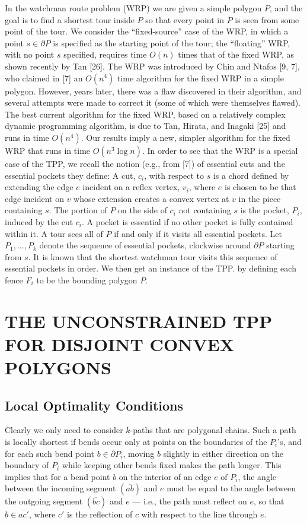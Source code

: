 \documentclass[a4paper]{article}
\begin{document}
In the watchman route problem (WRP) we are given a simple polygon \(P\), and the goal is to find a shortest tour inside \(P\) so that every point in \(P\) is seen from some point of the tour. We consider the “fixed-source” case of the WRP, in which a point \(s \in \partial P\) is specified as the starting point of the tour; the “floating” WRP, with no point \(s\) specified, requires time \(O(n)\) times that of the fixed WRP, as shown recently by Tan [26]. The WRP was introduced by Chin and Ntafos [9, 7], who claimed in [7] an \(O(n ^ 4)\) time algorithm for the fixed WRP in a simple polygon. However, years later, there was a flaw discovered in their algorithm, and several attempts were made to correct it (some of which were themselves flawed). The best current algorithm for the fixed WRP, based on a relatively complex dynamic programming algorithm, is due to Tan, Hirata, and Inagaki [25] and runs in time \(O(n ^ 4)\). Our results imply a new, simpler algorithm for the fixed WRP that runs in time \(O(n ^ 3 \log n)\). In order to see that the WRP is a special case of the TPP, we recall the notion (e.g., from [7]) of essential cuts and the essential pockets they define: A cut, \(c_i\), with respect to \(s\) is a chord defined by extending the edge \(e\) incident on a reflex vertex, \(v_i\), where \(e\) is chosen to be that edge incident on \(v\) whose extension creates a convex vertex at \(v\) in the piece containing \(s\). The portion of \(P\) on the side of \(c_i\) not containing \(s\) is the pocket, \(P_i\), induced by the cut \(c_i\). A pocket is essential if no other pocket is fully contained within it. A tour sees all of \(P\) if and only if it visits all essential pockets. Let \(P_1, \dots, P_k\) denote the sequence of essential pockets, clockwise around \(\partial P\) starting from \(s\). It is known that the shortest watchman tour visits this sequence of essential pockets in order. We then get an instance of the TPP. by defining each fence \(F_i\)
to be the bounding polygon \(P\).

\section{THE UNCONSTRAINED TPP FOR
DISJOINT CONVEX POLYGONS}

\subsection{Local Optimality Conditions}

Clearly we only need to consider \(k\)-paths that are polygonal chains. Such a path is locally shortest
if bends occur only at points on the boundaries of the \(P_i\)'s, and for each such bend point
\(b \in \partial P_i\), moving \(b\) slightly in either direction on the boundary of \(P_i\) while keeping other bends fixed makes the path longer. This implies that for a bend point \(b\) on the interior of an edge \(e\) of \(P_i\), the angle between the incoming segment \((\overline{ab})\) and \(e\) must be equal to the angle between the outgoing segment \((\overline{bc})\) and \(e\) — i.e., the path must reflect on \(e\), so that \(b \in \overline{ac'}\), where \(c'\) is the reflection of \(c\) with respect to the line through \(e\).
\end{document}
